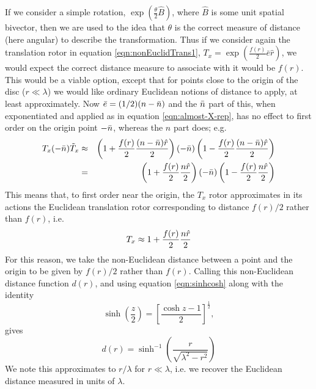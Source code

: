 If we consider a simple rotation,
$\exp\left(\frac{\theta}{2}\hat{B}\right)$, where $\hat{B}$ is some unit
spatial bivector, then we are used to the idea that
$\theta$ is the correct measure of distance (here
angular) to describe the transformation. Thus if we
consider again the translation rotor in
equation \ref{eqn:nonEuclidTrans1}, $T_x = \exp\left(\frac{f(r)}{2}\bar{e}\hat{r}\right)$,
%
%
we would expect the correct distance
measure to associate with it would be $f(r)$. This would be a
viable option, except that for points close to the origin of the
disc ($r\ll\lambda$) we would like ordinary Euclidean notions of
distance to apply, at least approximately. Now $\bar{e} =
(1/2)(n-\bar{n})$ and the $\bar{n}$ part of this, when exponentiated and
applied as in equation \ref{eqn:almost-X-rep}, has no effect to
first order on the origin point $-\bar{n}$, whereas the $n$ part does;
e.g.
%
\begin{eqnarray}
T_x(-\bar{n})\tilde{T}_x & \approx  & \left(1+
\frac{f(r)}{2}\frac{(n-\bar{n})\hat{r}}{2}\right)(-\bar{n})\left(1-
\frac{f(r)}{2}\frac{(n-\bar{n})\hat{r}}{2}\right)   \nonumber \\
 & =  &
\left(1+
\frac{f(r)}{2}\frac{n\hat{r}}{2}\right)(-\bar{n})\left(1 -
\frac{f(r)}{2}\frac{n\hat{r}}{2}\right)
\end{eqnarray}
%
This means that, to first order near the origin, the
$T_x$ rotor approximates in its actions the Euclidean
translation rotor corresponding to distance $f(r)/2$
rather than $f(r)$, i.e.
%
\begin{equation}
T_x \approx 1 + \frac{f(r)}{2}\frac{n \hat{r}}{2}
\end{equation}
%
For this reason, we take the non-Euclidean distance
between a point and the origin to be given by $f(r)/2$
rather than $f(r)$. Calling this non-Euclidean distance
function $d(r)$, and using equation
\ref{eqn:sinhcosh} along with the identity 
\[\sinh\left(\frac{z}{2}\right) =
\left[\frac{\cosh z - 1}{2}\right]^{\frac{1}{2}},\]
gives
%
\begin{equation} \label{eqn:defines-dofr}
d(r) =
\sinh^{-1}\left(\frac{r}{\sqrt{\lambda^2-r^2}}\right)
\end{equation}
%
We note this approximates to $r/\lambda$ for
$r\ll\lambda$, i.e. we recover the Euclidean distance
measured in units of $\lambda$.

